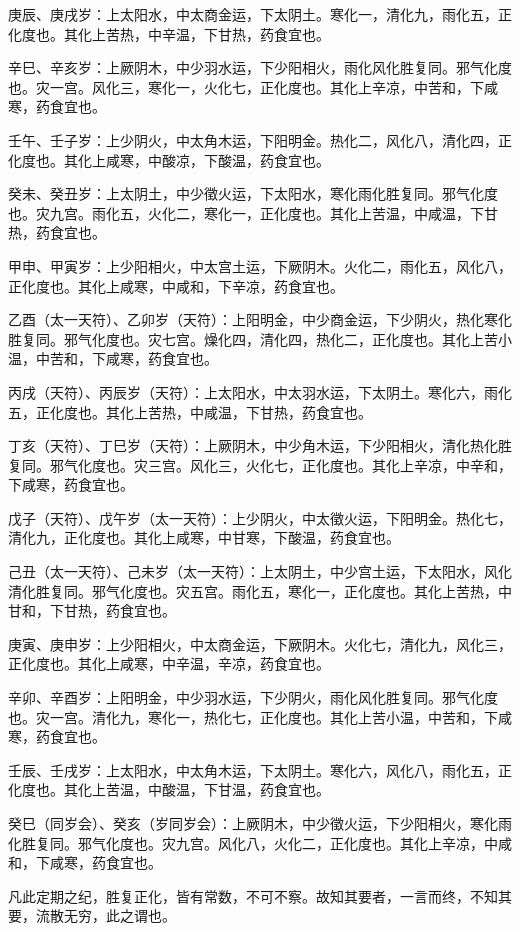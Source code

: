 \documentclass{article}%
\begin{document}
庚辰、庚戌岁：上太阳水，中太商金运，下太阴土。寒化一，清化九，雨化五，正化度也。其化上苦热，中辛温，下甘热，药食宜也。

辛巳、辛亥岁：上厥阴木，中少羽水运，下少阳相火，雨化风化胜复同。邪气化度也。灾一宫。风化三，寒化一，火化七，正化度也。其化上辛凉，中苦和，下咸寒，药食宜也。

壬午、壬子岁：上少阴火，中太角木运，下阳明金。热化二，风化八，清化四，正化度也。其化上咸寒，中酸凉，下酸温，药食宜也。

癸未、癸丑岁：上太阴土，中少徵火运，下太阳水，寒化雨化胜复同。邪气化度也。灾九宫。雨化五，火化二，寒化一，正化度也。其化上苦温，中咸温，下甘热，药食宜也。

甲申、甲寅岁：上少阳相火，中太宫土运，下厥阴木。火化二，雨化五，风化八，正化度也。其化上咸寒，中咸和，下辛凉，药食宜也。

乙酉（太一天符）、乙卯岁（天符）：上阳明金，中少商金运，下少阴火，热化寒化胜复同。邪气化度也。灾七宫。燥化四，清化四，热化二，正化度也。其化上苦小温，中苦和，下咸寒，药食宜也。

丙戌（天符）、丙辰岁（天符）：上太阳水，中太羽水运，下太阴土。寒化六，雨化五，正化度也。其化上苦热，中咸温，下甘热，药食宜也。

丁亥（天符）、丁巳岁（天符）：上厥阴木，中少角木运，下少阳相火，清化热化胜复同。邪气化度也。灾三宫。风化三，火化七，正化度也。其化上辛凉，中辛和，下咸寒，药食宜也。

戊子（天符）、戊午岁（太一天符）：上少阴火，中太徵火运，下阳明金。热化七，清化九，正化度也。其化上咸寒，中甘寒，下酸温，药食宜也。

己丑（太一天符）、己未岁（太一天符）：上太阴土，中少宫土运，下太阳水，风化清化胜复同。邪气化度也。灾五宫。雨化五，寒化一，正化度也。其化上苦热，中甘和，下甘热，药食宜也。

庚寅、庚申岁：上少阳相火，中太商金运，下厥阴木。火化七，清化九，风化三，正化度也。其化上咸寒，中辛温，辛凉，药食宜也。

辛卯、辛酉岁：上阳明金，中少羽水运，下少阴火，雨化风化胜复同。邪气化度也。灾一宫。清化九，寒化一，热化七，正化度也。其化上苦小温，中苦和，下咸寒，药食宜也。

壬辰、壬戌岁：上太阳水，中太角木运，下太阴土。寒化六，风化八，雨化五，正化度也。其化上苦温，中酸温，下甘温，药食宜也。

癸巳（同岁会）、癸亥（岁同岁会）：上厥阴木，中少徵火运，下少阳相火，寒化雨化胜复同。邪气化度也。灾九宫。风化八，火化二，正化度也。其化上辛凉，中咸和，下咸寒，药食宜也。

凡此定期之纪，胜复正化，皆有常数，不可不察。故知其要者，一言而终，不知其要，流散无穷，此之谓也。
\end{document}
